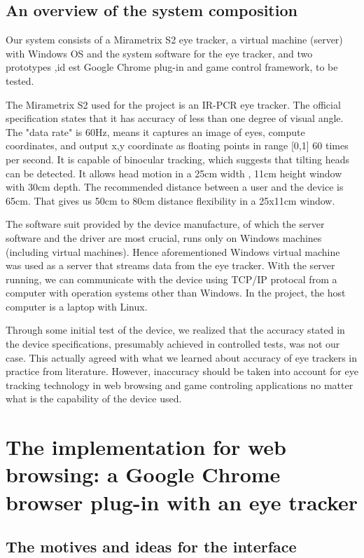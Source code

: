 \documentclass[english]{tktltiki}
\begin{document}
\subsection{An overview of the system composition}

Our system consists of a Mirametrix S2 eye tracker, a virtual machine (server) with Windows OS and the system software for the eye tracker, and two prototypes ,id est Google Chrome plug-in and game control framework, to be tested. 

The Mirametrix S2 used for the project is an IR-PCR eye tracker. The official specification states that it has accuracy of less than one degree of visual angle. The "data rate" is 60Hz, means it captures an image of eyes, compute coordinates, and output x,y coordinate as floating points in range [0,1] 60 times per second. It is capable of binocular tracking, which suggests that tilting heads can be detected. It allows head motion in a 25cm width , 11cm height window with 30cm depth. The recommended distance between a user and the device is 65cm. That gives us 50cm to 80cm distance flexibility in a 25x11cm window. 

The software suit provided by the device manufacture, of which the server software and the driver are most crucial, runs only on Windows machines (including virtual machines). Hence aforementioned Windows virtual machine was used as a server that streams data from the eye tracker. With the server running, we can communicate with the device using TCP/IP protocal from a computer with operation systems other than Windows. In the project, the host computer is a laptop with Linux. 

Through some initial test of the device, we realized that the accuracy stated in the device specifications, presumably achieved in controlled tests, was not our case. This actually agreed with what we learned about accuracy of eye trackers in practice from literature. \cite{majaranta14} However, inaccuracy should be taken into account for eye tracking technology in web browsing and game controling applications no matter what is the capability of the device used.


\section{The implementation for web browsing: a Google Chrome browser plug-in with an eye tracker}


\subsection{The motives and ideas for the interface}  
\end{document}
